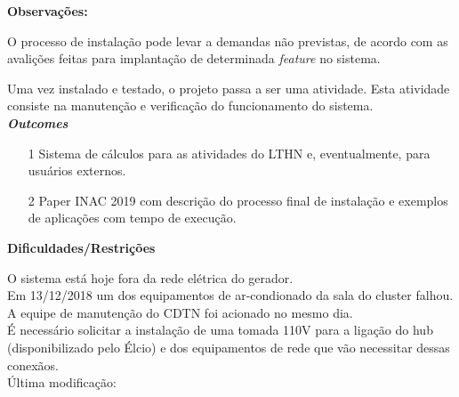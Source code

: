 \textbf{Observações:}

O processo de instalação pode levar a demandas não previstas, de acordo com as avalições feitas para implantação de determinada \textit{feature} no sistema.

Uma vez instalado e testado, o projeto passa a ser uma atividade. Esta atividade 
consiste na manutenção e verificação do funcionamento do sistema.\\

\textbf{\textit{Outcomes}}

\begin{itemize}
	\item[1] Sistema de cálculos para as atividades do LTHN e, eventualmente, para usuários externos.
	\item[2] Paper INAC 2019 com descrição do processo final de instalação e exemplos de aplicações com tempo de execução.

\end{itemize}


\textbf{Dificuldades/Restrições}

O sistema está hoje fora da rede elétrica do gerador.\\

Em 13/12/2018 um dos equipamentos de ar-condionado da sala do cluster falhou. A equipe de manutenção do CDTN foi acionado no mesmo dia.\\

É necessário solicitar a instalação de uma tomada 110V para a ligação do hub 
(disponibilizado pelo Élcio) e dos equipamentos de rede que vão necessitar 
dessas conexãos.\\

Última modificação: \date{\today}

